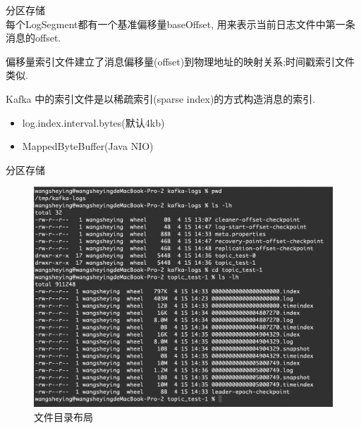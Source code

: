 \begin{frame}[plain,t]{分区存储} %
	 \\  \vspace{2ex}
    每个LogSegment都有一个基准偏移量baseOffset, 用来表示当前日志文件中第一条消息的offset.
    
    \vspace{2ex}
    偏移量索引文件建立了消息偏移量(offset)到物理地址的映射关系;时间戳索引文件类似.
    
    \vspace{2ex}
    Kafka 中的索引文件是以稀疏索引(sparse index)的方式构造消息的索引. 
    \begin{itemize}
        \item log.index.interval.bytes(默认4kb)
        \item MappedByteBuffer(Java NIO)%
    \end{itemize}
    
\end{frame}
\begin{frame}[plain,t]{分区存储} %
     \\  \vspace{2ex}
    \begin{figure}
        \centering
        \includegraphics[width=0.8\linewidth]{image/0402.png}
        \caption{文件目录布局}
        \label{fig:0402}
    \end{figure}
    
\end{frame}
